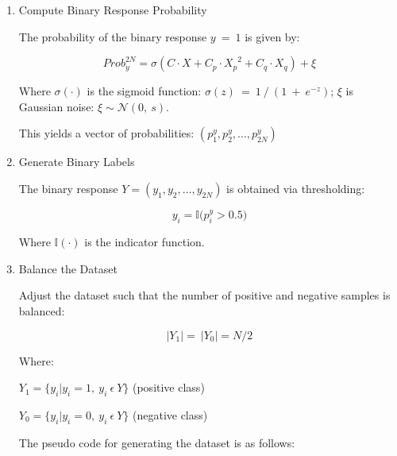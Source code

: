 \documentclass{article}
\begin{document}
\begin{enumerate}
    The q interaction terms: $C_{q} = (c_{1},c_{2},\ldots,c_{q})$, where $c_{q}\sim Uniform( - 1,\ 1)$.
    
    \item Compute Binary Response Probability
    
    The probability of the binary response $y\  = \ 1$ is given by:
    
    $${Prob}_{y}^{2N} = \sigma\left( C \cdot X + C_{p} \cdot {X_{p}}^{2} + C_{q} \cdot X_{q} \right) + \xi$$
    
    Where $\sigma( \cdot )$ is the sigmoid function: $\sigma(z)\  = \ 1\ /\ (1\  + \ e^{- z})$; $\xi$ is Gaussian noise: $\xi\sim\mathcal{N}(0,\ s)$.
    
    This yields a vector of probabilities: $(p_{1}^{y},p_{2}^{y},\ldots,p_{2N}^{y})$
    
    \item Generate Binary Labels
    
    The binary response $Y = (y_{1},y_{2},\ldots,y_{2N})$ is obtained via thresholding:
    
    $$y_{i} = \mathbb{I(}p_{i}^{y} > 0.5)$$
    
    Where $\mathbb{I( \cdot )}$ is the indicator function.
    
    \item Balance the Dataset
    
    Adjust the dataset such that the number of positive and negative samples is balanced:
    
    $$\left| Y_{1} \right| = \ \left| Y_{0} \right| = N/2$$
    
    Where:
    
    $Y_{1} = \{ y_{i}|y_{i} = 1,\ y_{i}\ \epsilon\ Y\}$ (positive class)
    
    $Y_{0} = \{ y_{i}|y_{i} = 0,\ y_{i}\ \epsilon\ Y\}$ (negative class)
    
    The pseudo code for generating the dataset is as follows:
\end{enumerate}
\end{document}
